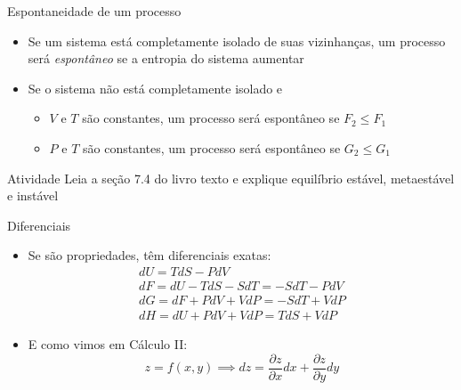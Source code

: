 \documentclass[t,%
brazilian,%
11pt,%
aspectratio=169,%
table%
]{beamer}
\begin{document}

\begin{frame}{Espontaneidade de um processo}
    \begin{itemize}
        \item Se um sistema está completamente isolado de suas vizinhanças, um processo
            será \textit{espontâneo} se a entropia do sistema aumentar
        \item Se o sistema não está completamente isolado e
            \begin{itemize}
                \item \(V\) e \(T\) são constantes, um processo será espontâneo se \(F_2 \leq F_1\)
                \item \(P\) e \(T\) são constantes, um processo será espontâneo se \(G_2 \leq G_1\)
            \end{itemize}
    \end{itemize}
    \begin{block}{Atividade}
        Leia a seção 7.4 do livro texto e explique equilíbrio estável, metaestável e instável
    \end{block}
\end{frame}

\begin{frame}{Diferenciais}
    \begin{itemize}
        \item Se são propriedades, têm diferenciais exatas:
            \begin{gather*}
                dU = TdS - PdV \\
                dF = dU - TdS - SdT = -SdT - PdV \\
                dG= dF + PdV + VdP = -SdT + VdP \\
                dH = dU + PdV + VdP = TdS + VdP
            \end{gather*}
        \item E como vimos em Cálculo II:
            \[
                z=f(x,y) \implies dz = \frac{\partial z}{\partial x} dx + \frac{\partial z}{\partial y} dy
            \]
    \end{itemize}
\end{frame}
\end{document}
